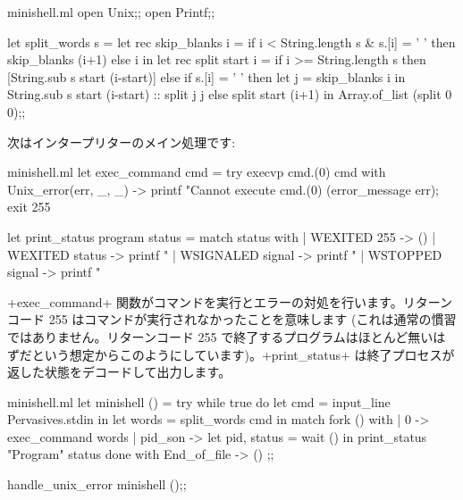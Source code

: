 \begin{listingcodefile}{minishell.ml}
open Unix;;
open Printf;;

let split_words s =
 let rec skip_blanks i =
   if i < String.length s & s.[i] = ' '
   then skip_blanks (i+1)
   else i in
 let rec split start i =
   if i >= String.length s then
     [String.sub s start (i-start)]
   else if s.[i] = ' ' then
     let j = skip_blanks i in
     String.sub s start (i-start) :: split j j
   else
     split start (i+1) in
 Array.of_list (split 0 0);;
\end{listingcodefile}
%
次はインタープリターのメイン処理です:
%
\begin{listingcodefile}{minishell.ml}
let exec_command cmd =
 try execvp cmd.(0) cmd
 with Unix_error(err, _, _) ->
   printf "Cannot execute %
     cmd.(0) (error_message err);
   exit 255

let print_status program status =
 match status with
 | WEXITED 255 -> ()
 | WEXITED status ->
     printf "%
 | WSIGNALED signal ->
     printf "%
 | WSTOPPED signal ->
     printf "%
\end{listingcodefile}
%
\ml+exec_command+ 関数がコマンドを実行とエラーの対処を行います。リターンコード 255 はコマンドが実行されなかったことを意味します (これは通常の慣習ではありません。リターンコード 255 で終了するプログラムはほとんど無いはずだという想定からこのようにしています)。\ml+print_status+ は終了プロセスが返した状態をデコードして出力します。
%
\begin{listingcodefile}{minishell.ml}
let minishell () =
 try
   while true do
     let cmd = input_line Pervasives.stdin in
     let words = split_words cmd in
     match fork () with
     | 0 -> exec_command words
     | pid_son ->
         let pid, status = wait () in
         print_status "Program" status
   done
 with End_of_file -> ()
;;

handle_unix_error minishell ();;
\end{listingcodefile}
%
